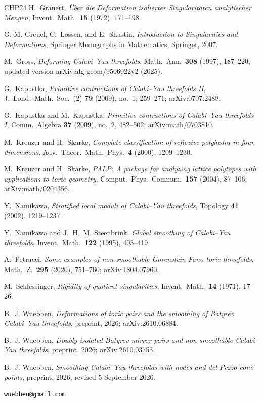 \documentclass[11pt]{amsart}
\theoremstyle{definition}
\theoremstyle{remark}
\begin{document}
\begin{thebibliography}{CHP24}
H.~Grauert,
\emph{\"Uber die Deformation isolierter Singularit\"aten analytischer Mengen},
Invent.\ Math.\ \textbf{15} (1972), 171--198.

G.-M. Greuel, C.~Lossen, and E.~Shustin,
\emph{Introduction to Singularities and Deformations},
Springer Monographs in Mathematics, Springer, 2007.

M.~Gross,
\emph{Deforming Calabi--Yau threefolds},
Math.\ Ann.\ \textbf{308} (1997), 187--220; updated version arXiv:alg-geom/9506022v2 (2025).

G.~Kapustka,
\emph{Primitive contractions of Calabi--Yau threefolds II},
J.\ Lond.\ Math.\ Soc.\ (2) \textbf{79} (2009), no.~1, 259--271;
arXiv:0707.2488.

G.~Kapustka and M.~Kapustka,
\emph{Primitive contractions of Calabi--Yau threefolds I},
Comm.\ Algebra \textbf{37} (2009), no.~2, 482--502; arXiv:math/0703810.

M.~Kreuzer and H.~Skarke,
\emph{Complete classification of reflexive polyhedra in four dimensions},
Adv.\ Theor.\ Math.\ Phys.\ \textbf{4} (2000), 1209--1230.

M.~Kreuzer and H.~Skarke,
\emph{PALP: A package for analyzing lattice polytopes with applications to
toric geometry}, Comput.\ Phys.\ Commun.\ \textbf{157} (2004), 87--106;
arXiv:math/0204356.

Y.~Namikawa,
\emph{Stratified local moduli of Calabi--Yau threefolds},
Topology \textbf{41} (2002), 1219--1237.

Y.~Namikawa and J.~H.~M. Steenbrink,
\emph{Global smoothing of Calabi--Yau threefolds},
Invent.\ Math.\ \textbf{122} (1995), 403--419.

A.~Petracci,
\emph{Some examples of non-smoothable Gorenstein Fano toric threefolds},
Math.\ Z.\ \textbf{295} (2020), 751--760; arXiv:1804.07960.

M.~Schlessinger,
\emph{Rigidity of quotient singularities},
Invent.\ Math.\ \textbf{14} (1971), 17--26.

B.~J. Wuebben,
\emph{Deformations of toric pairs and the smoothing of
Batyrev Calabi--Yau threefolds},
preprint, 2026; arXiv:2610.06884.

B.~J. Wuebben,
\emph{Doubly isolated Batyrev mirror pairs and non-smoothable Calabi--Yau
threefolds},
preprint, 2026; arXiv:2610.03753.

 B.~J. Wuebben, \emph{Smoothing Calabi--Yau threefolds with nodes and del Pezzo cone points},
preprint, 2026, revised 5 September 2026.
\end{thebibliography}

\bigskip
{} \texttt{wuebben@gmail.com}
\end{document}
